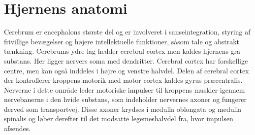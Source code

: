 \section{Hjernens anatomi}
Cerebrum er encephalons største del og er involveret i sanseintegration, styring af frivillige bevægelser og højere intellektuelle funktioner, såsom tale og abstrakt tænkning. \cite{Academic2015b} Cerebrums ydre lag hedder cerebral cortex men kaldes hjernens grå substans. Her ligger nervers soma med dendritter. Cerebral cortex har forskellige centre, men kan også inddeles i højre og venstre halvdel. Delen af cerebral cortex der kontrollerer kroppens motorik med motor cortex kaldes gyrus præcentralis. Nerverne i dette område leder motoriske impulser til kroppens muskler igennem nervebanerne i den hvide substans, som indeholder nervernes axoner og fungerer derved som transportvej. \cite{Academic2015b,Martini2012,Stanfield2014} Disse axoner krydses i medulla oblongata og medulla spinalis og løber derefter til det modsatte legemeshalvdel fra, hvor impulsen afsendes. \cite{Martini2012}
